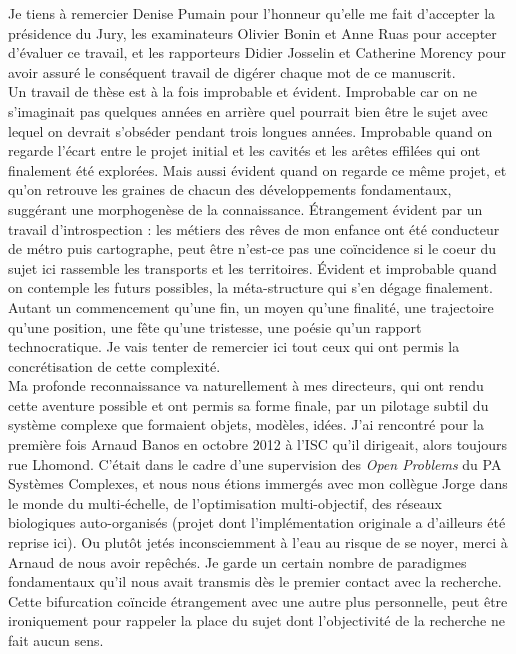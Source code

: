 
Je tiens à remercier Denise Pumain pour l'honneur qu'elle me fait d'accepter la présidence du Jury, les examinateurs Olivier Bonin et Anne Ruas pour accepter d'évaluer ce travail, et les rapporteurs Didier Josselin et Catherine Morency pour avoir assuré le conséquent travail de digérer chaque mot de ce manuscrit.\\

Un travail de thèse est à la fois improbable et évident. Improbable car on ne s'imaginait pas quelques années en arrière quel pourrait bien être le sujet avec lequel on devrait s'obséder pendant trois longues années. Improbable quand on regarde l'écart entre le projet initial et les cavités et les arêtes effilées qui ont finalement été explorées. Mais aussi évident quand on regarde ce même projet, et qu'on retrouve les graines de chacun des développements fondamentaux, suggérant une morphogenèse de la connaissance. Étrangement évident par un travail d'introspection : les métiers des rêves de mon enfance ont été conducteur de métro puis cartographe, peut être n'est-ce pas une coïncidence si le coeur du sujet ici rassemble les transports et les territoires. Évident et improbable quand on contemple les futurs possibles, la méta-structure qui s'en dégage finalement. Autant un commencement qu'une fin, un moyen qu'une finalité, une trajectoire qu'une position, une fête qu'une tristesse, une poésie qu'un rapport technocratique. Je vais tenter de remercier ici tout ceux qui ont permis la concrétisation de cette complexité.\\



Ma profonde reconnaissance va naturellement à mes directeurs, qui ont rendu cette aventure possible et ont permis sa forme finale, par un pilotage subtil du système complexe que formaient objets, modèles, idées. J'ai rencontré pour la première fois Arnaud Banos en octobre 2012 à l'ISC qu'il dirigeait, alors toujours rue Lhomond. C'était dans le cadre d'une supervision des \emph{Open Problems} du PA Systèmes Complexes, et nous nous étions immergés avec mon collègue Jorge dans le monde du multi-échelle, de l'optimisation multi-objectif, des réseaux biologiques auto-organisés (projet dont l'implémentation originale a d'ailleurs été reprise ici). Ou plutôt jetés inconsciemment à l'eau au risque de se noyer, merci à Arnaud de nous avoir repêchés. Je garde un certain nombre de paradigmes fondamentaux qu'il nous avait transmis dès le premier contact avec la recherche. Cette bifurcation coïncide étrangement avec une autre plus personnelle, peut être ironiquement pour rappeler la place du sujet dont l'objectivité de la recherche ne fait aucun sens.

